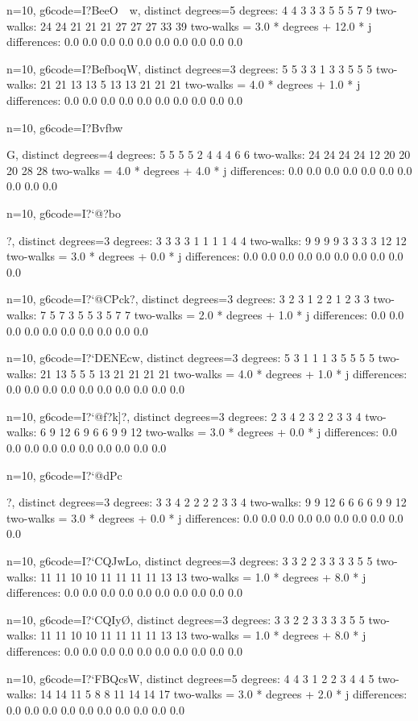 {{{{{{{{{{n=10, g6code=I?BeeO~~w, distinct degrees=5
degrees: 4 4 3 3 3 5 5 5 7 9 
two-walks: 24 24 21 21 21 27 27 27 33 39 
two-walks = 3.0 * degrees + 12.0 * j
differences: 0.0 0.0 0.0 0.0 0.0 0.0 0.0 0.0 0.0 0.0 

n=10, g6code=I?BefboqW, distinct degrees=3
degrees: 5 5 3 3 1 3 3 5 5 5 
two-walks: 21 21 13 13 5 13 13 21 21 21 
two-walks = 4.0 * degrees + 1.0 * j
differences: 0.0 0.0 0.0 0.0 0.0 0.0 0.0 0.0 0.0 0.0 

n=10, g6code=I?Bvfbw}G, distinct degrees=4
degrees: 5 5 5 5 2 4 4 4 6 6 
two-walks: 24 24 24 24 12 20 20 20 28 28 
two-walks = 4.0 * degrees + 4.0 * j
differences: 0.0 0.0 0.0 0.0 0.0 0.0 0.0 0.0 0.0 0.0 

n=10, g6code=I?`@?bo{?, distinct degrees=3
degrees: 3 3 3 3 1 1 1 1 4 4 
two-walks: 9 9 9 9 3 3 3 3 12 12 
two-walks = 3.0 * degrees + 0.0 * j
differences: 0.0 0.0 0.0 0.0 0.0 0.0 0.0 0.0 0.0 0.0 

n=10, g6code=I?`@CPck?, distinct degrees=3
degrees: 3 2 3 1 2 2 1 2 3 3 
two-walks: 7 5 7 3 5 5 3 5 7 7 
two-walks = 2.0 * degrees + 1.0 * j
differences: 0.0 0.0 0.0 0.0 0.0 0.0 0.0 0.0 0.0 0.0 

n=10, g6code=I?`DENEcw, distinct degrees=3
degrees: 5 3 1 1 1 3 5 5 5 5 
two-walks: 21 13 5 5 5 13 21 21 21 21 
two-walks = 4.0 * degrees + 1.0 * j
differences: 0.0 0.0 0.0 0.0 0.0 0.0 0.0 0.0 0.0 0.0 

n=10, g6code=I?`@f?k]?, distinct degrees=3
degrees: 2 3 4 2 3 2 2 3 3 4 
two-walks: 6 9 12 6 9 6 6 9 9 12 
two-walks = 3.0 * degrees + 0.0 * j
differences: 0.0 0.0 0.0 0.0 0.0 0.0 0.0 0.0 0.0 0.0 

n=10, g6code=I?`@dPc{?, distinct degrees=3
degrees: 3 3 4 2 2 2 2 3 3 4 
two-walks: 9 9 12 6 6 6 6 9 9 12 
two-walks = 3.0 * degrees + 0.0 * j
differences: 0.0 0.0 0.0 0.0 0.0 0.0 0.0 0.0 0.0 0.0 

n=10, g6code=I?`CQJwLo, distinct degrees=3
degrees: 3 3 2 2 3 3 3 3 5 5 
two-walks: 11 11 10 10 11 11 11 11 13 13 
two-walks = 1.0 * degrees + 8.0 * j
differences: 0.0 0.0 0.0 0.0 0.0 0.0 0.0 0.0 0.0 0.0 

n=10, g6code=I?`CQIy\O, distinct degrees=3
degrees: 3 3 2 2 3 3 3 3 5 5 
two-walks: 11 11 10 10 11 11 11 11 13 13 
two-walks = 1.0 * degrees + 8.0 * j
differences: 0.0 0.0 0.0 0.0 0.0 0.0 0.0 0.0 0.0 0.0 

n=10, g6code=I?`FBQcsW, distinct degrees=5
degrees: 4 4 3 1 2 2 3 4 4 5 
two-walks: 14 14 11 5 8 8 11 14 14 17 
two-walks = 3.0 * degrees + 2.0 * j
differences: 0.0 0.0 0.0 0.0 0.0 0.0 0.0 0.0 0.0 0.0 

}}}}}}}}}}}
